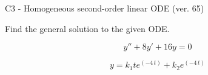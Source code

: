 \begin{exercise}
  \begin{exerciseTitle}C3 - Homogeneous second-order linear ODE (ver. 65)\end{exerciseTitle}
  \begin{exerciseStatement}
    
Find the general solution to the given ODE.

    
\[y''+8y'+16y = 0\]

  \end{exerciseStatement}
  \begin{exerciseAnswer}
    
\[y= k_{1} t e^{\left(-4 \, t\right)} + k_{2} e^{\left(-4 \, t\right)}\]

  \end{exerciseAnswer}
\end{exercise}